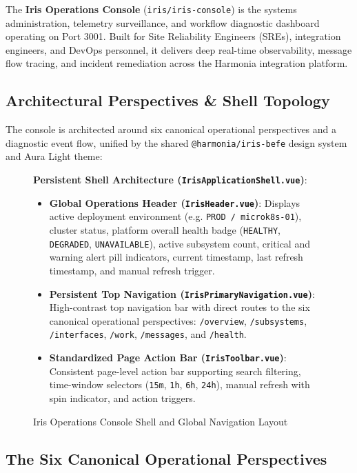The \textbf{Iris Operations Console} (\texttt{iris/iris-console}) is the systems administration, telemetry surveillance, and workflow diagnostic dashboard operating on Port 3001. Built for Site Reliability Engineers (SREs), integration engineers, and DevOps personnel, it delivers deep real-time observability, message flow tracing, and incident remediation across the Harmonia integration platform.

\subsection{Architectural Perspectives \& Shell Topology}

The console is architected around six canonical operational perspectives and a diagnostic event flow, unified by the shared \texttt{@harmonia/iris-befe} design system and Aura Light theme:

\begin{figure}[htbp]
\centering
\begin{archinote}
\textbf{Persistent Shell Architecture (\texttt{IrisApplicationShell.vue})}:
\begin{itemize}
    \item \textbf{Global Operations Header (\texttt{IrisHeader.vue})}: Displays active deployment environment (e.g. \texttt{PROD / microk8s-01}), cluster status, platform overall health badge (\texttt{HEALTHY}, \texttt{DEGRADED}, \texttt{UNAVAILABLE}), active subsystem count, critical and warning alert pill indicators, current timestamp, last refresh timestamp, and manual refresh trigger.
    \item \textbf{Persistent Top Navigation (\texttt{IrisPrimaryNavigation.vue})}: High-contrast top navigation bar with direct routes to the six canonical operational perspectives: \texttt{/overview}, \texttt{/subsystems}, \texttt{/interfaces}, \texttt{/work}, \texttt{/messages}, and \texttt{/health}.
    \item \textbf{Standardized Page Action Bar (\texttt{IrisToolbar.vue})}: Consistent page-level action bar supporting search filtering, time-window selectors (\texttt{15m}, \texttt{1h}, \texttt{6h}, \texttt{24h}), manual refresh with spin indicator, and action triggers.
\end{itemize}
\end{archinote}
\caption{Iris Operations Console Shell and Global Navigation Layout}
\label{fig:iris_console_shell}
\end{figure}

\subsection{The Six Canonical Operational Perspectives}

